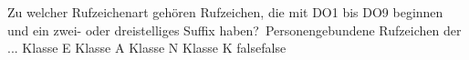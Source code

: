    {Zu welcher Rufzeichenart gehören Rufzeichen, die mit DO1 bis DO9 beginnen und ein zwei- oder dreistelliges Suffix haben? Personengebundene Rufzeichen der ...}
    {Klasse E}
    {Klasse A}
    {Klasse N}
    {Klasse K}
    {false}{false}